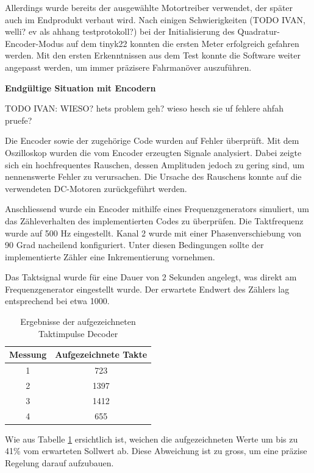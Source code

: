 Allerdings wurde bereits der ausgewählte Motortreiber verwendet, der später auch im Endprodukt verbaut wird. Nach einigen Schwierigkeiten (TODO IVAN, welli? ev als ahhang testprotokoll?) bei der Initialisierung des Quadratur-Encoder-Modus auf dem \gls{tinyk22} konnten die ersten Meter erfolgreich gefahren werden. Mit den ersten Erkenntnissen aus dem Test konnte die Software weiter angepasst werden, um immer präzisere Fahrmanöver auszuführen.

\textbf{Endgültige Situation mit Encodern}

TODO IVAN: WIESO? hets problem geh? wieso hesch sie uf fehlere ahfah pruefe?

Die Encoder sowie der zugehörige Code wurden auf Fehler überprüft. Mit dem Oszilloskop wurden die vom Encoder erzeugten Signale analysiert. Dabei zeigte sich ein hochfrequentes Rauschen, dessen Amplituden jedoch zu gering sind, um nennenswerte Fehler zu verursachen. Die Ursache des Rauschens konnte auf die verwendeten DC-Motoren zurückgeführt werden.

Anschliessend wurde ein Encoder mithilfe eines Frequenzgenerators simuliert, um das Zähleverhalten des implementierten Codes zu überprüfen. Die Taktfrequenz wurde auf 500 Hz eingestellt. Kanal 2 wurde mit einer Phasenverschiebung von 90 Grad nacheilend konfiguriert. Unter diesen Bedingungen sollte der implementierte Zähler eine Inkrementierung vornehmen.

Das Taktsignal wurde für eine Dauer von 2 Sekunden angelegt, was direkt am Frequenzgenerator eingestellt wurde. Der erwartete Endwert des Zählers lag entsprechend bei etwa 1000.

\begin{table}[ht]
\centering
\caption{Ergebnisse der aufgezeichneten Taktimpulse Decoder}
\label{tab:taktergebnisse_de}
\begin{tabular}{|c|c|}
\hline
\textbf{Messung} & \textbf{Aufgezeichnete Takte} \\
\hline
1 & 723 \\
2 & 1397 \\
3 & 1412 \\
4 & 655 \\
\hline
\end{tabular}
\end{table}

Wie aus Tabelle \ref{tab:taktergebnisse_de} ersichtlich ist, weichen die aufgezeichneten Werte um bis zu 41\% vom erwarteten Sollwert ab. Diese Abweichung ist zu gross, um eine präzise Regelung darauf aufzubauen.

